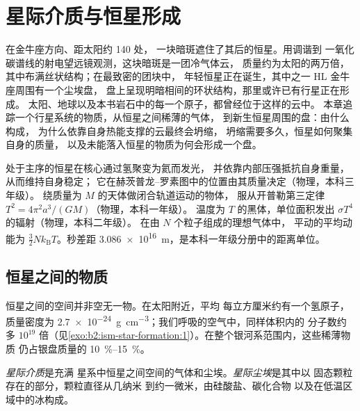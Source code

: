 \chapter{星际介质与恒星形成}\label{ch:b2:ism-star-formation}

在金牛座方向、距太阳约 \qty{140}{\parsec} 处，
一块暗斑遮住了其后的恒星。用调谐到
一氧化碳谱线的射电望远镜观测，这块暗斑是一团冷气体云，
质量约为太阳的两万倍，其中布满丝状结构；在最致密的团块中，
年轻恒星正在诞生，其中之一 HL 金牛座周围有一个尘埃盘，
盘上呈现明暗相间的环状结构，那里或许已有行星正在形成。
太阳、地球以及本书岩石中的每一个原子，都曾经位于这样的云中。
本章追踪一个行星系统的物质，从恒星之间稀薄的气体，
到新生恒星周围的盘：由什么构成，
为什么依靠自身热能支撑的云最终会坍缩，
坍缩需要多久，恒星如何聚集自身的质量，
以及未能落入恒星的物质为何会形成一个盘。

\begin{recall}
处于主序的恒星在核心通过氢聚变为氦而发光，
并依靠内部压强抵抗自身重量，从而维持自身稳定；
它在赫茨普龙–罗素图中的位置由其质量决定（物理，本科三年级）。
绕质量为 $M$ 的天体做闭合轨道运动的物体，
服从开普勒第三定律 $T^2 = 4\pi^2 a^3/(GM)$（物理，本科一年级）。
温度为 $T$ 的黑体，单位面积发出 $\sigma T^4$ 的辐射（物理，本科二年级）。
在由 $N$ 个粒子组成的理想气体中，
平动的平均动能为 $\tfrac32 N k_{\mathrm B} T$。秒差距
\qty{3.086e16}{m}，是本科一年级分册中的距离单位。
\end{recall}

\section{恒星之间的物质}

恒星之间的空间并非空无一物。在太阳附近，平均
每立方厘米约有一个氢原子，质量密度为
\qty{2.7e-24}{g.cm^{-3}}；我们呼吸的空气中，同样体积内的
分子数约多 $10^{19}$ 倍（见\cref{exo:b2:ism-star-formation:1}）。在整个银河系范围内，这些稀薄物质
仍占银盘质量的
\qtyrange{10}{15}{\percent}。

\begin{definition}
\label{def:b2:ism-star-formation:ism}
\emph{星际介质}是充满
星系中恒星之间空间的气体和尘埃。\emph{星际尘埃}是其中以
固态颗粒存在的部分，颗粒直径从几纳米
到约一微米，由硅酸盐、碳化合物
以及在低温区域中的冰构成。
\end{definition}


